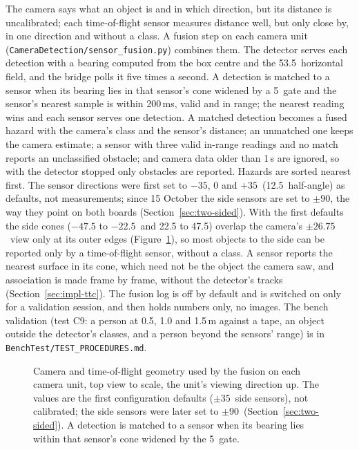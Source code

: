 The camera says what an object is and in which direction, but its distance is uncalibrated; each time-of-flight sensor measures distance well, but only close by, in one direction and without a class. A fusion step on each camera unit (\texttt{CameraDetection/\allowbreak{}sensor\_\allowbreak{}fusion.py}) combines them. The detector serves each detection with a bearing computed from the box centre and the 53.5\textdegree\ horizontal field, and the bridge polls it five times a second. A detection is matched to a sensor when its bearing lies in that sensor's cone widened by a 5\textdegree\ gate and the sensor's nearest sample is within 200\,ms, valid and in range; the nearest reading wins and each sensor serves one detection. A matched detection becomes a fused hazard with the camera's class and the sensor's distance; an unmatched one keeps the camera estimate; a sensor with three valid in-range readings and no match reports an unclassified obstacle; and camera data older than 1\,s are ignored, so with the detector stopped only obstacles are reported. Hazards are sorted nearest first. The sensor directions were first set to $-35$, 0 and $+35$\textdegree\ (12.5\textdegree\ half-angle) as defaults, not measurements; since 15 October the side sensors are set to $\pm 90$\textdegree, the way they point on both boards (Section~\ref{sec:two-sided}). With the first defaults the side cones ($-47.5$ to $-22.5$\textdegree\ and 22.5 to 47.5\textdegree) overlap the camera's $\pm 26.75$\textdegree\ view only at its outer edges (Figure~\ref{fig:fusion-geometry}), so most objects to the side can be reported only by a time-of-flight sensor, without a class. A sensor reports the nearest surface in its cone, which need not be the object the camera saw, and association is made frame by frame, without the detector's tracks (Section~\ref{sec:impl-ttc}). The fusion log is off by default and is switched on only for a validation session, and then holds numbers only, no images. The bench validation (test C9: a person at 0.5, 1.0 and 1.5\,m against a tape, an object outside the detector's classes, and a person beyond the sensors' range) is in \texttt{BenchTest/\allowbreak{}TEST\_\allowbreak{}PROCEDURES.md}.

\begin{figure}[htbp]
\centering

\caption[Camera and time-of-flight geometry used by the fusion on each camera unit, top view to scale, the unit's viewing direction up]{Camera and time-of-flight geometry used by the fusion on each camera unit, top view to scale, the unit's viewing direction up. The values are the first configuration defaults ($\pm 35$\textdegree\ side sensors), not calibrated; the side sensors were later set to $\pm 90$\textdegree\ (Section~\ref{sec:two-sided}). A detection is matched to a sensor when its bearing lies within that sensor's cone widened by the 5\textdegree\ gate.}
\label{fig:fusion-geometry}
\end{figure}

